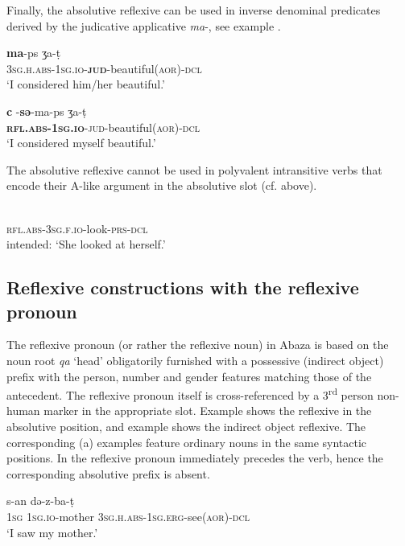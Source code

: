 \documentclass[output=paper]{langscibook}
\begin{document}
Finally, the absolutive reflexive can be used in inverse denominal predicates derived by the judicative applicative \textit{ma}{}-, see example .

\ea 
\label{ex:Arkadiev:24}
    \ea 
    \label{ex:Arkadiev:24a}
    \textbf{{ma}}{{}-ps {ʒ}a-t{̣}}\\
     \textsc{3sg.h.abs-1sg.io-}\textbf{\textsc{jud}}{}-beautiful(\textsc{aor)-dcl}\\
    \glt  ‘I considered him/her beautiful.’
    
    \ex 
    \label{ex:Arkadiev:24b}
    \gll \textbf{{c} }{{}-}\textbf{{s{ə}}}{{}-ma-ps {ʒ}a-t{̣}}\\
     \textbf{\textsc{rfl.abs-1sg.io}}\textsc{{}-jud}{}-beautiful(\textsc{aor)-dcl}\\
    \glt   ‘I considered myself beautiful.’
    \z
\z    


The absolutive reflexive cannot be used in polyvalent intransitive verbs that encode their A-like argument in the absolutive slot (cf.  above).

\ea
    \label{ex:Arkadiev:25}
    \\
   \textsc{rfl.abs-3sg.f.io}{}-look-\textsc{prs-dcl}\\
    \glt intended: ‘She looked at herself.’
\z


\subsection{Reflexive constructions with the reflexive pronoun}
\label{sec:Arkadiev:2.2}

The reflexive pronoun (or rather the reflexive noun) in Abaza is based on the noun root \textit{qa} ‘head’ obligatorily furnished with a possessive (indirect object) prefix with the person, number and gender features matching those of the antecedent. The reflexive pronoun itself is cross-referenced by a 3\textsuperscript{rd} person non-human marker in the appropriate slot. Example  shows the reflexive in the absolutive position, and example  shows the indirect object reflexive. The corresponding (a) examples feature ordinary nouns in the same syntactic positions. In  the reflexive pronoun immediately precedes the verb, hence the corresponding absolutive prefix is absent.

\ea 
\label{ex:Arkadiev:26}
    \ea 
    \label{ex:Arkadiev:26a}
      {s-an}  {d{ə}-z-ba-t{̣}}\\
      \textsc{1sg}  \textsc{1sg.io}{}-mother  \textsc{3sg.h.abs-1sg.erg}{}-see(\textsc{aor)-dcl}\\
    \glt ‘I saw my mother.’
    
\end{document}
